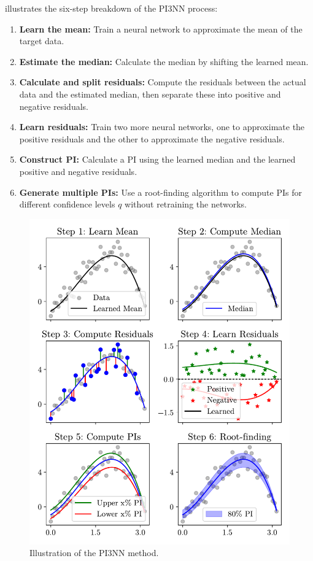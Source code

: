  illustrates the six-step breakdown of the PI3NN process:
\begin{enumerate}
    \item \textbf{Learn the mean:} Train a neural network to approximate the mean of the target data.
    \item \textbf{Estimate the median:} Calculate the median by shifting the learned mean.
    \item \textbf{Calculate and split residuals:} Compute the residuals between the actual data and the estimated median, then separate these into positive and negative residuals.
    \item \textbf{Learn residuals:} Train two more neural networks, one to approximate the positive residuals and the other to approximate the negative residuals.
    \item \textbf{Construct PI:} Calculate a PI using the learned median and the learned positive and negative residuals.
    \item \textbf{Generate multiple PIs:} Use a root-finding algorithm to compute PIs for different confidence levels $q$ without retraining the networks.
\end{enumerate}


\begin{figure}[h]
    \centering
    \includegraphics{figs/3pinn_illustration.pdf}
    \caption{Illustration of the PI3NN method.}
    \label{fig:3pinn_illustration}
\end{figure}





